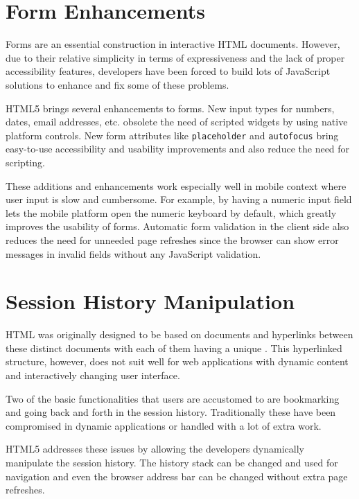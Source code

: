 \section{Form Enhancements}

Forms are an essential construction in interactive HTML
documents. However, due to their relative simplicity in terms of
expressiveness and the lack of proper accessibility features,
developers have been forced to build lots of JavaScript solutions to
enhance and fix some of these problems.

HTML5 brings several enhancements to forms. New input types for
numbers, dates, email addresses, etc. obsolete the need of scripted
widgets by using native platform controls. New form attributes like
\texttt{placeholder} and \texttt{autofocus} bring easy-to-use
accessibility and usability improvements and also reduce the need for
scripting. \cite{HTML5draft}

These additions and enhancements work especially well in mobile
context where user input is slow and cumbersome. For example, by
having a numeric input field lets the mobile platform open the numeric
keyboard by default, which greatly improves the usability of
forms. Automatic form validation in the client side also reduces the
need for unneeded page refreshes since the browser can show error
messages in invalid fields without any JavaScript validation.

\section{Session History Manipulation}

HTML was originally designed to be based on documents and hyperlinks
between these distinct documents with each of them having a unique
. This hyperlinked structure, however, does not suit well
for web applications with dynamic content and interactively changing
user interface.

Two of the basic functionalities that users are accustomed to are
bookmarking and going back and forth in the session
history. Traditionally these have been compromised in dynamic
 applications or handled with a lot of extra work.

HTML5 addresses these issues by allowing the developers dynamically
manipulate the session history. The history stack can be changed and
used for navigation and even the browser address bar can be changed
without extra page refreshes. \cite{HTML5draft}

